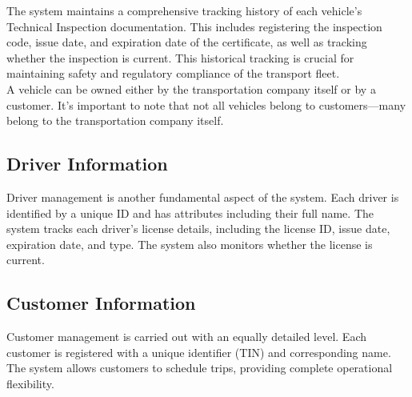 \documentclass[11pt, a4paper]{article}
\begin{document}
The system maintains a comprehensive tracking history of each vehicle's Technical Inspection documentation. This includes registering the inspection code, issue date, and expiration date of the certificate, as well as tracking whether the inspection is current. This historical tracking is crucial for maintaining safety and regulatory compliance of the transport fleet.\\

A vehicle can be owned either by the transportation company itself or by a customer. It's important to note that not all vehicles belong to customers—many belong to the transportation company itself.\\

\subsection{Driver Information}
Driver management is another fundamental aspect of the system. Each driver is identified by a unique ID and has attributes including their full name. The system tracks each driver's license details, including the license ID, issue date, expiration date, and type. The system also monitors whether the license is current.\\

\subsection{Customer Information}
Customer management is carried out with an equally detailed level. Each customer is registered with a unique identifier (TIN) and corresponding name. The system allows customers to schedule trips, providing complete operational flexibility.\\

\newpage

\end{document}
